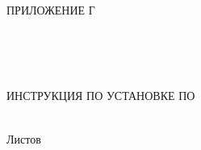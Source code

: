 \begin{ESKDtitlePage}
  \begin{flushright}
    ПРИЛОЖЕНИЕ Г \enspace
  \end{flushright}
  
  \begin{center}
    \envDiplomEducation \\
    \envDiplomUniversity \\
    \envDiplomCathedra \\
  \end{center}

  \vfill

  \begin{center}
    ИНСТРУКЦИЯ ПО УСТАНОВКЕ ПО
  \end{center}

  \vfill

  \begin{center}
    \envCode \\
    Листов \pageref{LastPage} \\
  \end{center}

  \vfill

  

  \vfill

  \begin{center}
    \ESKDtheYear
  \end{center}
\end{ESKDtitlePage}
